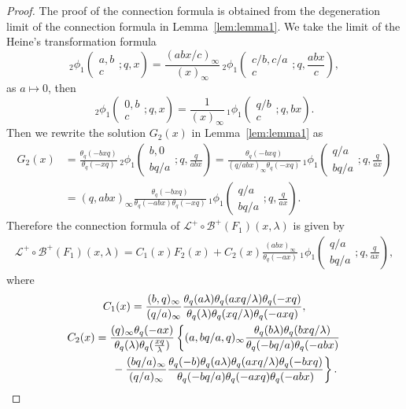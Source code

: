 \documentclass[pdftex]{sigma}
\numberwithin{equation}{section}
\theoremstyle{definition}
\begin{document}
\begin{proof}
The proof of the connection formula is obtained from the degeneration limit of the connection formula in Lemma~\ref{lem:lemma1}.
We take the limit of the Heine's transformation formula
\[
{}_2\phi_1\left(\begin{matrix}a,b\\c\end{matrix};q,x\right)
 =
 \frac{(abx/c)_\infty}{(x)_\infty}\,{}_2\phi_1\left(\begin{matrix}c/b,c/a\\ c\end{matrix};q,\frac{abx}{c}\right),
\]
as $a\mapsto0$, then
\[
{}_2\phi_1\left(\begin{matrix}0,b\\c\end{matrix};q,x\right)=\frac{1}{(x)_\infty}\, {}_1\phi_1\left(\begin{matrix}q/b\\c\end{matrix};q,bx\right).
\]
Then we rewrite the solution $G_2(x)$ in Lemma~\ref{lem:lemma1} as
\begin{align*}
G_2(x)
 &=
 \frac{\theta_q(-bxq)}{\theta_q(-xq)}\,{}_2\phi_1\left(\begin{matrix}b,0\\ bq/a\end{matrix};q,\frac{q}{abx}\right)
 =
 \frac{\theta_q(-bxq)}{(q/abx)_\infty \theta_q(-xq)}\,{}_1\phi_1\left(\begin{matrix}q/a\\ bq/a\end{matrix};q,\frac{q}{ax}\right) \\
 &=
 (q,abx)_\infty \frac{\theta_q(-bxq)}{\theta_q(-abx)\theta_q(-xq)}\,{}_1\phi_1\left(\begin{matrix}q/a\\ bq/a\end{matrix};q,\frac{q}{ax}\right).
\end{align*}
Therefore the connection formula of $\mathcal{L}^+\circ\mathcal{B}^+(F_1)(x,\lambda)$ is given by
\begin{gather}
\label{eq:prot connec}
\mathcal{L}^+\circ\mathcal{B}^+(F_1)(x,\lambda)=C_1(x)F_2(x)+C_2(x)\frac{(abx)_\infty}{\theta_q(-ax)}\,{}_1\phi_1\left(\begin{matrix}q/a\\ bq/a\end{matrix};q,\frac{q}{ax}\right),
\end{gather}
where
\begin{gather*}
C_1(x)
 =
 \frac{(b,q)_\infty}{(q/a)_\infty}\frac{\theta_q(a\lambda)\theta_q(axq/\lambda)\theta_q(-xq)}{\theta_q(\lambda)\theta_q(xq/\lambda)\theta_q(-axq)}, \\
C_2(x)
 =
 \frac{(q)_\infty\theta_q(-ax)}{\theta_q(\lambda)\theta_q(\frac{xq}{\lambda})}\left\{ (a,bq/a,q)_\infty\frac{\theta_q(b\lambda)\theta_q(bxq/\lambda)}{\theta_q(-bq/a)\theta_q(-abx)}\right.\\
\left.\hphantom{C_2(x)=}{}
-\frac{(bq/a)_\infty}{(q/a)_\infty}\frac{\theta_q(-b)\theta_q(a\lambda)\theta_q(axq/\lambda)\theta_q(-bxq)}{\theta_q(-bq/a)\theta_q(-axq)\theta_q(-abx)}\right\}.
\end{gather*}


\end{proof}
\end{document}

